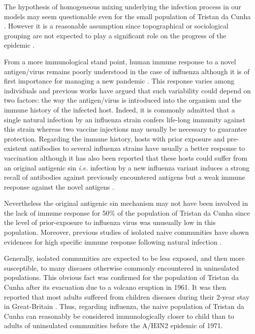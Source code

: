 The hypothesis of homogeneous mixing underlying the infection process
in our models may seem questionable even for the small population of
Tristan da Cunha \citep{Becker1983}. However it is a reasonable
assumption since topographical or sociological grouping
\citep{Shibli1971} are not expected to play a significant role on the
progress of the epidemic \citep{Hammond1971}.

From a more immunological stand point, human immune response to a
novel antigen/virus remains poorly understood in the case of influenza
although it is of first importance for managing a new pandemic
\citep{Doherty2006}. This response varies among individuals and
previous works have argued that such variability could depend on two
factors: the way the antigen/virus is introduced into the organism and
the immune history of the infected host. Indeed, it is commonly
admitted that a single natural infection by an influenza strain
confers life-long immunity against this strain whereas two vaccine
injections may usually be necessary to guarantee protection.
%
Regarding the immune history, hosts with prior exposure and
pre-existent antibodies to several influenza strains have usually a
better response to vaccination \citep{Brown1969a} although it has also
been reported that these hosts could suffer from an original antigenic
sin \textit{i.e.} infection by a new influenza variant induces a
strong recall of antibodies against previously encountered antigens
but a weak immune response against the novel antigens \citep{Kim2009}.

Nevertheless the original antigenic sin mechanism may not have been
involved in the lack of immune response for 50\% of the population of
Tristan da Cunha since the level of prior-exposure to influenza virus
was unusually low in this population. Moreover, previous studies of
isolated naive communities have shown evidences for high specific
immune response following natural infection
\citep{Brown1966,Brown1969a,Brown1969b}.

Generally, isolated communities are expected to be less exposed, and
then more susceptible, to many diseases otherwise commonly encountered
in uninsulated populations. This obvious fact was confirmed for the
population of Tristan da Cunha after its evacuation due to a volcano
eruption in 1961. It was then reported that most adults suffered from
children diseases during their 2-year stay in Great-Britain
\citep{Tyrrell1967}. Thus, regarding influenza, the naive population
of Tristan da Cunha can reasonably be considered immunologically
closer to child than to adults of uninsulated communities before the
A/H3N2 epidemic of 1971.

